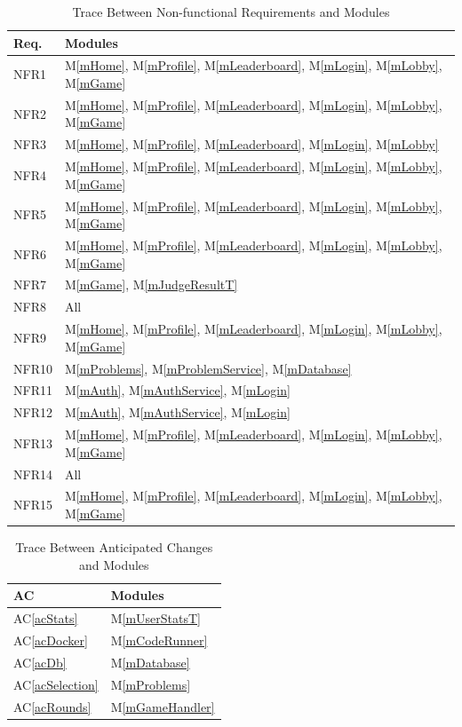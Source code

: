 \documentclass[12pt, titlepage]{article}
\newcommand{\acref}[1]{AC\ref{#1}}
\newcommand{\mref}[1]{M\ref{#1}}
\begin{document}
\begin{table}[H]
\centering 
\begin{tabular}{p{} p{}}
\toprule
\textbf{Req.} & \textbf{Modules}\\
\midrule
NFR1 & \mref{mHome}, \mref{mProfile}, \mref{mLeaderboard}, \mref{mLogin}, \mref{mLobby}, \mref{mGame} \\ %
NFR2 & \mref{mHome}, \mref{mProfile}, \mref{mLeaderboard}, \mref{mLogin}, \mref{mLobby}, \mref{mGame} \\ %
NFR3 & \mref{mHome}, \mref{mProfile}, \mref{mLeaderboard}, \mref{mLogin}, \mref{mLobby} \\ %
NFR4 & \mref{mHome}, \mref{mProfile}, \mref{mLeaderboard}, \mref{mLogin}, \mref{mLobby}, \mref{mGame}\\
NFR5 & \mref{mHome}, \mref{mProfile}, \mref{mLeaderboard}, \mref{mLogin}, \mref{mLobby}, \mref{mGame}\\ %
NFR6 & \mref{mHome}, \mref{mProfile}, \mref{mLeaderboard}, \mref{mLogin}, \mref{mLobby}, \mref{mGame} \\
NFR7 & \mref{mGame}, \mref{mJudgeResultT}\\
NFR8 & All\\ 
NFR9 & \mref{mHome}, \mref{mProfile}, \mref{mLeaderboard}, \mref{mLogin}, \mref{mLobby}, \mref{mGame} \\ %
NFR10 & \mref{mProblems}, \mref{mProblemService}, \mref{mDatabase}\\
NFR11 & \mref{mAuth}, \mref{mAuthService}, \mref{mLogin}\\ 
NFR12 & \mref{mAuth}, \mref{mAuthService}, \mref{mLogin}\\
NFR13 & \mref{mHome}, \mref{mProfile}, \mref{mLeaderboard}, \mref{mLogin}, \mref{mLobby}, \mref{mGame}\\
NFR14 & All\\
NFR15 & \mref{mHome}, \mref{mProfile}, \mref{mLeaderboard}, \mref{mLogin}, \mref{mLobby}, \mref{mGame}\\
\bottomrule
\end{tabular}
\caption{Trace Between Non-functional Requirements and Modules}
\label{TblRT2}
\end{table}

\begin{table}[H]
\centering
\begin{tabular}{p{} p{}}
\toprule
\textbf{AC} & \textbf{Modules}\\
\midrule
\acref{acStats} & \mref{mUserStatsT}\\
\acref{acDocker} & \mref{mCodeRunner}\\
\acref{acDb} & \mref{mDatabase}\\
\acref{acSelection} & \mref{mProblems}\\
\acref{acRounds} & \mref{mGameHandler}\\
\bottomrule
\end{tabular}
\caption{Trace Between Anticipated Changes and Modules}
\label{TblACT}
\end{table}
\end{document}
